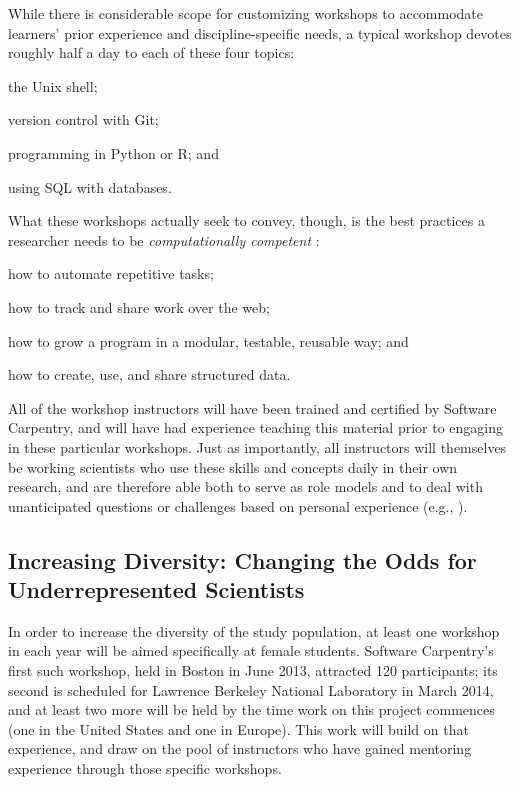 \documentclass{proposalnsf}
\begin{document}
While there is considerable scope for customizing workshops to
accommodate learners' prior experience and discipline-specific needs,
a typical workshop devotes roughly half a day to each of these four
topics:

\begin{compactitem}
\item
  the Unix shell;
\item
  version control with Git;
\item
  programming in Python or R; and
\item
  using SQL with databases.
\end{compactitem}

What these workshops actually seek to convey, though, is the best
practices a researcher needs to be \emph{computationally competent}
\cite{wilson2013}:

\begin{compactitem}
\item
  how to automate repetitive tasks;
\item
  how to track and share work over the web;
\item
  how to grow a program in a modular, testable, reusable way; and
\item
  how to create, use, and share structured data.
\end{compactitem}

All of the workshop instructors will have been trained and certified
by Software Carpentry, and will have had experience teaching this
material prior to engaging in these particular workshops.  Just as
importantly, all instructors will themselves be working scientists who use these
skills and concepts daily in their own research, and are therefore
able both to serve as role models and to deal with unanticipated
questions or challenges based on personal experience (e.g.,
\cite{ram2013}).

\subsection{Increasing Diversity: Changing the Odds for Underrepresented Scientists}
\label{sec:diversity}

In order to increase the diversity of the study population, at least
one workshop in each year will be aimed specifically at female
students.  Software Carpentry's first such workshop, held in Boston in
June 2013, attracted 120 participants; its second is scheduled for
Lawrence Berkeley National Laboratory in March 2014, and at least two
more will be held by the time work on this project commences (one in
the United States and one in Europe).  This work will build on that
experience, and draw on the pool of instructors who have gained
mentoring experience through those specific workshops.
\end{document}

